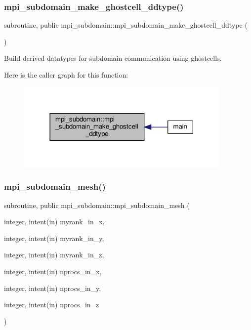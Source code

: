 \subsubsection{\texorpdfstring{mpi\+\_\+subdomain\+\_\+make\+\_\+ghostcell\+\_\+ddtype()}{mpi\_subdomain\_make\_ghostcell\_ddtype()}}
{\footnotesize\ttfamily subroutine, public mpi\+\_\+subdomain\+::mpi\+\_\+subdomain\+\_\+make\+\_\+ghostcell\+\_\+ddtype (\begin{DoxyParamCaption}{ }\end{DoxyParamCaption})}



Build derived datatypes for subdomain communication using ghostcells. 

Here is the caller graph for this function\+:
\nopagebreak
\begin{figure}[H]
\begin{center}
\leavevmode
\includegraphics[width=297pt]{namespacempi__subdomain_ad788c273d92ea7058caf0874bffdad6d_icgraph}
\end{center}
\end{figure}
\mbox{\label{namespacempi__subdomain_a612331eead74041f174ece9a572c7427}} 
\subsubsection{\texorpdfstring{mpi\+\_\+subdomain\+\_\+mesh()}{mpi\_subdomain\_mesh()}}
{\footnotesize\ttfamily subroutine, public mpi\+\_\+subdomain\+::mpi\+\_\+subdomain\+\_\+mesh (\begin{DoxyParamCaption}\item[{integer, intent(in)}]{myrank\+\_\+in\+\_\+x,  }\item[{integer, intent(in)}]{myrank\+\_\+in\+\_\+y,  }\item[{integer, intent(in)}]{myrank\+\_\+in\+\_\+z,  }\item[{integer, intent(in)}]{nprocs\+\_\+in\+\_\+x,  }\item[{integer, intent(in)}]{nprocs\+\_\+in\+\_\+y,  }\item[{integer, intent(in)}]{nprocs\+\_\+in\+\_\+z }\end{DoxyParamCaption})}



